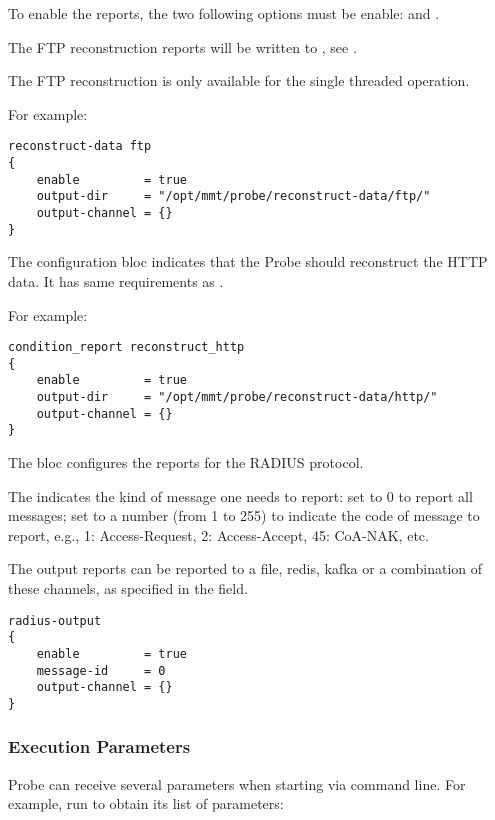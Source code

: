 To enable the reports, the two following options must be enable:  and .

The FTP reconstruction reports will be written to , see .
 
The FTP reconstruction is only available for the single threaded operation.

For example:


\begin{lstlisting}[style=CONFIG]
reconstruct-data ftp
{   
    enable         = true 
    output-dir     = "/opt/mmt/probe/reconstruct-data/ftp/"
    output-channel = {}
}
\end{lstlisting}


The configuration bloc indicates that the Probe should reconstruct the HTTP data. 
It has same requirements as .

For example:


\begin{lstlisting}[style=CONFIG]
condition_report reconstruct_http
{
    enable         = true
    output-dir     = "/opt/mmt/probe/reconstruct-data/http/"
    output-channel = {}
}
\end{lstlisting}


The  bloc configures the reports for the RADIUS protocol.
 
The  indicates the kind of message one needs to report:
set to 0 to report all messages;
set to a number (from 1 to 255) to indicate the code of message to report, e.g., 1: Access-Request, 2: Access-Accept, 45: CoA-NAK, etc.
 
The output reports can be reported to a file, redis, kafka or a combination of these channels, as specified in the   field.

\begin{lstlisting}[style=CONFIG]
radius-output
{
    enable         = true
    message-id     = 0 
    output-channel = {}  
}
\end{lstlisting}
   

\subsubsection{Execution Parameters}   

Probe can receive several parameters when starting via command line. For example, run  to obtain its list of parameters: 

